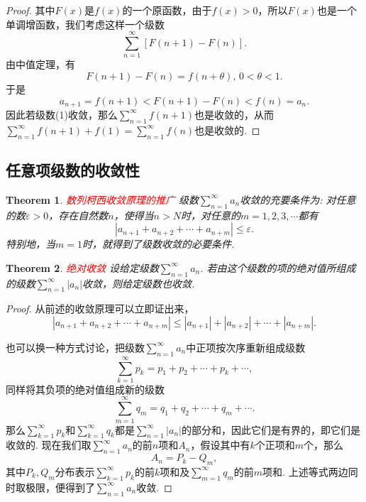 \documentclass{article}
\newtheorem{theorem}{Theorem}[section]
\newcommand{\redt}[1]{\textcolor{red}{#1}}
\begin{document}
\begin{proof}
其中$F(x)$是$f(x)$的一个原函数，由于$f(x) > 0$，所以$F(x)$也是一个单调增函数，我们考虑这样一个级数
\begin{equation}
\sum\limits_{n=1}^{\infty} \left[F(n+1)-F(n)\right].
\end{equation}
由中值定理，有
$$
F(n+1)-F(n) = f(n+\theta),\, 0 < \theta < 1.
$$
于是
$$
a_{n+1} = f(n+1) < F(n+1)-F(n) < f(n)=a_n. 
$$
因此若级数(1)收敛，那么$\sum\limits_{n=1}^{\infty}f(n+1)$也是收敛的，从而$\sum\limits_{n=1}^{\infty}f(n+1) + f(1)  = \sum\limits_{n=1}^{\infty}f(n)$也是收敛的. 
\end{proof}


\newpage
\subsection{任意项级数的收敛性}

\begin{theorem}
\rm \redt{数列柯西收敛原理的推广} 级数$\sum\limits_{n=1}^{\infty}a_n$收敛的充要条件为: 对任意的数$\varepsilon > 0$，存在自然数$n$，使得当$n > N$时，对任意的$m=1,2,3,\cdots$都有
$$
|a_{n+1}+a_{n+2}+\cdots+a_{n+m}| \leq \varepsilon.
$$
特别地，当$m=1$时，就得到了级数收敛的必要条件. 
\end{theorem}

\begin{theorem}
\rm \redt{绝对收敛} 设给定级数$\sum\limits_{n=1}^{\infty}a_n$. 若由这个级数的项的绝对值所组成的级数$\sum\limits_{n=1}^{\infty}|a_n|$收敛，则给定级数也收敛.
\end{theorem}

\begin{proof}
\rm 从前述的收敛原理可以立即证出来，
$$
|a_{n+1}+a_{n+2}+\cdots+a_{n+m}| \leq |a_{n+1}| + |a_{n+2}| +\cdots + |a_{n+m}|.
$$

也可以换一种方式讨论，把级数$\sum\limits_{n=1}^{\infty}a_n$中正项按次序重新组成级数
$$
\sum\limits_{k=1}^{\infty} p_k = p_1 + p_2 + \cdots + p_k + \cdots,
$$
同样将其负项的绝对值组成新的级数
$$
\sum\limits_{m=1}^{\infty} q_m = q_1 + q_2 + \cdots + q_m + \cdots.
$$
那么$\sum\limits_{k=1}^{\infty} p_k$和$\sum\limits_{k=1}^{\infty} q_k$都是$\sum\limits_{n=1}^{\infty}|a_n|$的部分和，因此它们是有界的，即它们是收敛的. 现在我们取$\sum\limits_{n=1}^{\infty}a_n$的前$n$项和$A_n$，假设其中有$k$个正项和$m$个，那么
$$
A_n = P_k -Q_m,
$$
其中$P_k,Q_m$分布表示$\sum\limits_{k=1}^{\infty} p_k$的前$k$项和及$\sum\limits_{m=1}^{\infty} q_m$的前$m$项和. 上述等式两边同时取极限，便得到了$\sum\limits_{n=1}^{\infty}a_n$收敛. 
\end{proof}
\end{document}
